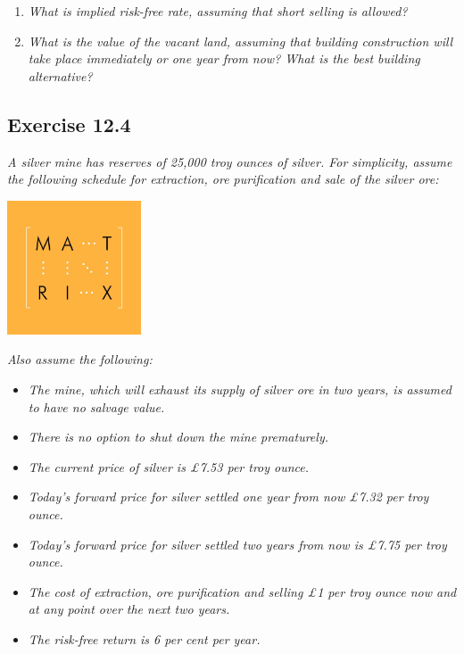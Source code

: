 \documentclass[]{book}
\theoremstyle{definition}
\theoremstyle{definition}
\theoremstyle{remark}
\begin{document}
\begin{enumerate}
\def\labelenumi{\alph{enumi}.}
\item
  \emph{What is implied risk-free rate, assuming that short selling is
  allowed?} \citep[p.425]{book}
\item
  \emph{What is the value of the vacant land, assuming that building
  construction will take place immediately or one year from now? What is
  the best building alternative?} \citep[p.425]{book}
\end{enumerate}

\subsection{Exercise 12.4}\label{exercise-12.4}

\emph{A silver mine has reserves of 25,000 troy ounces of silver. For
simplicity, assume the following schedule for extraction, ore
purification and sale of the silver ore:} \citep[p.425]{book}

\begin{center}\includegraphics[width=150px]{figures/matrix} \end{center}

\emph{Also assume the following:} \citep[p.425]{book}

\begin{itemize}
\item
  \emph{The mine, which will exhaust its supply of silver ore in two
  years, is assumed to have no salvage value.} \citep[p.425]{book}
\item
  \emph{There is no option to shut down the mine prematurely.}
  \citep[p.425]{book}
\item
  \emph{The current price of silver is £7.53 per troy ounce.}
  \citep[p.425]{book}
\item
  \emph{Today's forward price for silver settled one year from now £7.32
  per troy ounce.} \citep[p.425]{book}
\item
  \emph{Today's forward price for silver settled two years from now is
  £7.75 per troy ounce.} \citep[p.425]{book}
\item
  \emph{The cost of extraction, ore purification and selling £1 per troy
  ounce now and at any point over the next two years.}
  \citep[p.425]{book}
\item
  \emph{The risk-free return is 6 per cent per year.}
  \citep[p.425]{book}
\end{itemize}
\end{document}
